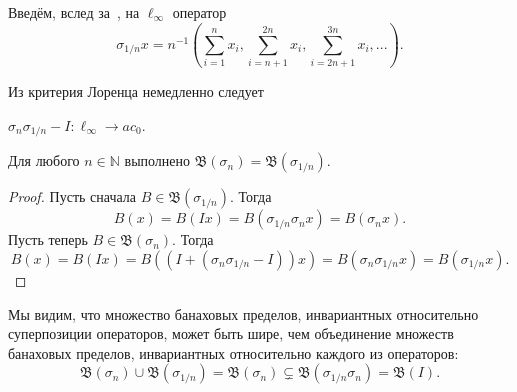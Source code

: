 Введём, вслед за~\cite[p. 131, prop. 2.b.2]{lindenstrauss1979classical},
на $\ell_\infty$ оператор
\begin{equation}
	\sigma_{1/n} x = n^{-1}
	\left(
		\sum_{i=1}^{n} x_i,
		\sum_{i=n+1}^{2n} x_i,
		\sum_{i=2n+1}^{3n} x_i,
		...
	\right).
\end{equation}

Из критерия Лоренца немедленно следует
\begin{lemma}
	$\sigma_n \sigma_{1/n} - I : \ell_\infty \to ac_0$.
\end{lemma}

\begin{theorem}
	Для любого $n\in\mathbb{N}$ выполнено $\mathfrak{B}(\sigma_n) = \mathfrak{B}(\sigma_{1/n})$.
\end{theorem}

\begin{proof}
	Пусть сначала $B \in \mathfrak{B}(\sigma_{1/n})$.
	Тогда
	\begin{equation}
		B(x) = B(Ix) = B(\sigma_{1/n} \sigma_n x) = B(\sigma_n x)
		.
	\end{equation}
	Пусть теперь $B \in \mathfrak{B}(\sigma_n)$.
	Тогда
	\begin{equation}
		B(x) = B(Ix) = B((I+(\sigma_n \sigma_{1/n} - I)) x) = B(\sigma_n \sigma_{1/n} x) = B(\sigma_{1/n} x)
		.
	\end{equation}
\end{proof}

\begin{remark}
	Мы видим, что множество банаховых пределов, инвариантных относительно суперпозиции операторов,
	может быть шире, чем объединение множеств банаховых пределов,
	инвариантных относительно каждого из операторов:
	\begin{equation}
		\mathfrak{B}(\sigma_n) \cup \mathfrak{B}(\sigma_{1/n}) = \mathfrak{B}(\sigma_n) \subsetneq \mathfrak{B}(\sigma_{1/n}\sigma_n) = \mathfrak{B}(I)
		.
	\end{equation}
\end{remark}
